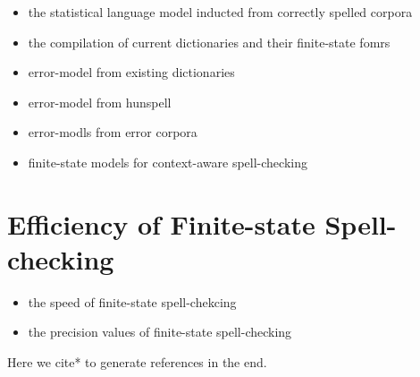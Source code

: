 \documentclass[officiallayout]{unihelcompling}
\begin{document}
\begin{itemize}
    \item the statistical language model inducted from correctly spelled corpora
    \item the compilation of current dictionaries and their finite-state fomrs
    \item error-model from existing dictionaries
    \item error-model from hunspell
    \item error-modls from error corpora
    \item finite-state models for context-aware spell-checking
\end{itemize}

\chapter{Efficiency of Finite-state Spell-checking}

\begin{itemize}
    \item the speed of finite-state spell-chekcing
    \item the precision values of finite-state spell-checking
\end{itemize}

Here we cite* to generate references in the end. \cite{*}



\end{document}
